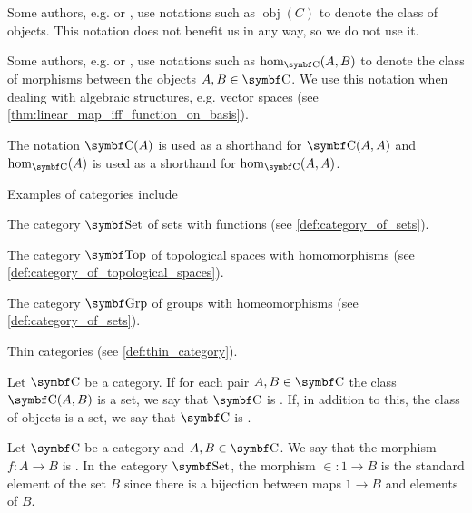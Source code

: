 \begin{remark}\label{remark:category_obj_hom}
  Some authors, e.g. \cite{Leinster2014} or \cite{Aluffi2009}, use notations such as \( \operatorname{obj}(C) \) to denote the class of objects. This notation does not benefit us in any way, so we do not use it.

  Some authors, e.g. \cite{MacLane1994} or \cite{Aluffi2009}, use notations such as \( \operatorname{hom}_{\Bold C}(A, B) \) to denote the class of morphisms between the objects \( A, B \in \Bold C \). We use this notation when dealing with algebraic structures, e.g. vector spaces (see \cref{thm:linear_map_iff_function_on_basis}).

  The notation \( \Cat{C}(A) \) is used as a shorthand for \( \Bold{C}(A, A) \) and \( \hom_{\Bold C}(A) \) is used as a shorthand for \( \hom_{\Bold C}(A, A) \).
\end{remark}

\begin{example}\label{ex:categories}
  Examples of categories include

  \begin{defenum}
    \item The category \( \Cat{Set} \) of sets with functions (see \cref{def:category_of_sets}).
    \item The category \( \Cat{Top} \) of topological spaces with homomorphisms (see \cref{def:category_of_topological_spaces}).
    \item The category \( \Cat{Grp} \) of groups with homeomorphisms (see \cref{def:category_of_sets}).
    \item Thin categories (see \cref{def:thin_category}).
  \end{defenum}
\end{example}

\begin{definition}\label{def:category_cardinality}
  Let \( \Cat{C} \) be a category. If for each pair \( A, B \in \Bold C \) the class \( \Bold C(A, B) \) is a set, we say that \( \Bold C \) is . If, in addition to this, the class of objects is a set, we say that \( \Bold C \) is .
\end{definition}

\begin{definition}\label{def:generalized_element}\cite[definition 4.1.25]{Leinster2014}
  Let \( \Bold C \) be a category and \( A, B \in \Bold C \). We say that the morphism \( f: A \to B \) is . In the category \( \Cat{Set} \), the morphism \( \in : 1 \to B \) is the standard element of the set \( B \) since there is a bijection between maps \( 1 \to B \) and elements of \( B \).
\end{definition}

